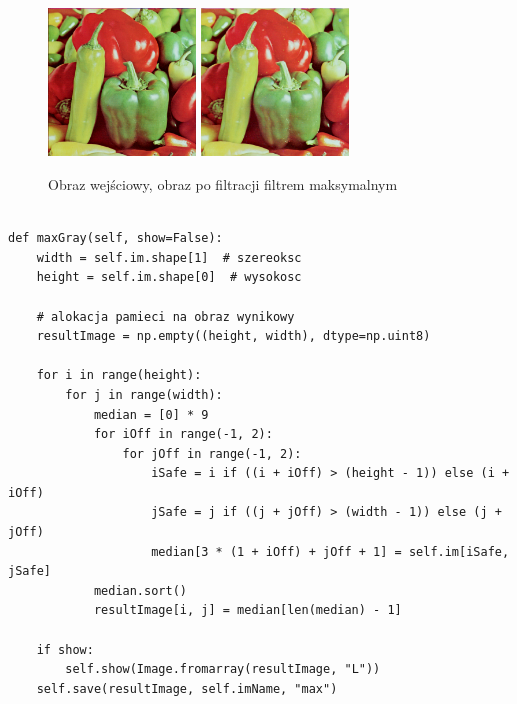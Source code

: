 \documentclass[final,a4paper,openany,12pt]{mwbk}
\begin{document}
\begin{figure}[H]
	\begin{center}
		\includegraphics[width=0.35\textwidth]{peppers_color}
		\includegraphics[width=0.35\textwidth]{peppers_color_max_result}
	\end{center}
	\caption{Obraz wejściowy, obraz po filtracji filtrem maksymalnym}
\end{figure}

\newpage


\begin{lstlisting}[caption=Filtr maksymalny (obraz szary)]
	
def maxGray(self, show=False):
	width = self.im.shape[1]  # szereoksc
	height = self.im.shape[0]  # wysokosc
	
	# alokacja pamieci na obraz wynikowy
	resultImage = np.empty((height, width), dtype=np.uint8)
	
	for i in range(height):
		for j in range(width):
			median = [0] * 9
			for iOff in range(-1, 2):
				for jOff in range(-1, 2):
					iSafe = i if ((i + iOff) > (height - 1)) else (i + iOff)
					jSafe = j if ((j + jOff) > (width - 1)) else (j + jOff)
					median[3 * (1 + iOff) + jOff + 1] = self.im[iSafe, jSafe]
			median.sort()
			resultImage[i, j] = median[len(median) - 1]
	
	if show:
		self.show(Image.fromarray(resultImage, "L"))
	self.save(resultImage, self.imName, "max")
	
\end{lstlisting}
\end{document}

